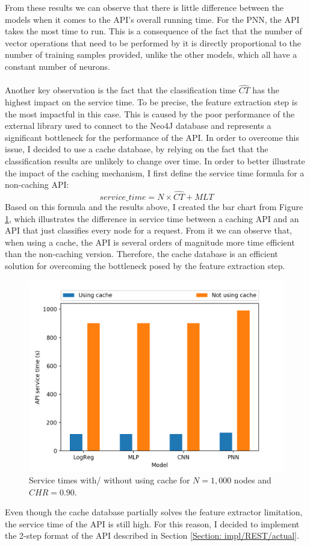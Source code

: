 			From these results we can observe that there is little difference between the models when it comes to the API's overall running time. For the PNN, the API takes the most time to run. This is a consequence of the fact that the number of vector operations that need to be performed by it is directly proportional to the number of training samples provided, unlike the other models, which all have a constant number of neurons. 
			\\ \\
			Another key observation is the fact that the classification time $\hat{CT}$ has the highest impact on the service time. To be precise, the feature extraction step is the most impactful in this case. This is caused by the poor performance of the external library used to connect to the Neo4J database and represents a significant bottleneck for the performance of the API. In order to overcome this issue, I decided to use a cache database, by relying on the fact that the classification results are unlikely to change over time. In order to better illustrate the impact of the caching mechanism, I first define the service time formula for a non-caching API:
			\begin{equation}
				service\_time = N \times \hat{CT} + MLT
			\end{equation}
			Based on this formula and the results above, I created the bar chart from Figure \ref{Fig: eval/service-time/bringing/bar}, which illustrates the difference in service time between a caching API and an API that just classifies every node for a request. From it we can observe that, when using a cache, the API is several orders of magnitude more time efficient than the non-caching version. Therefore, the cache database is an efficient solution for overcoming the bottleneck posed by the feature extraction step.  
			\begin{figure}[H]
				\centering
				\includegraphics[width=.7\textwidth]{graphics/service-time-hist}
				\caption{Service times with/ without using cache for $N=1,000$ nodes and $CHR=0.90$.}
				\label{Fig: eval/service-time/bringing/bar}
			\end{figure}
			Even though the cache database partially solves the feature extractor limitation, the service time of the API is still high. For this reason, I decided to implement the 2-step format of the API described in Section \ref{Section: impl/REST/actual}.
